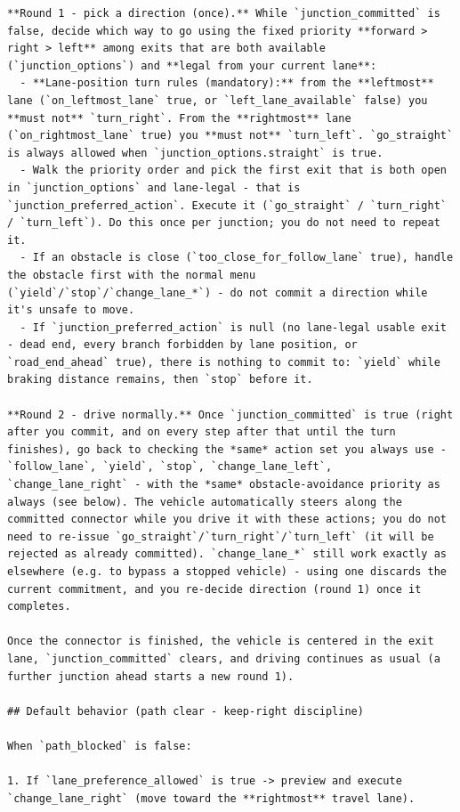 \begin{Verbatim}[breaklines=true,breakanywhere=true,fontsize=\footnotesize]
**Round 1 - pick a direction (once).** While `junction_committed` is false, decide which way to go using the fixed priority **forward > right > left** among exits that are both available (`junction_options`) and **legal from your current lane**:
  - **Lane-position turn rules (mandatory):** from the **leftmost** lane (`on_leftmost_lane` true, or `left_lane_available` false) you **must not** `turn_right`. From the **rightmost** lane (`on_rightmost_lane` true) you **must not** `turn_left`. `go_straight` is always allowed when `junction_options.straight` is true.
  - Walk the priority order and pick the first exit that is both open in `junction_options` and lane-legal - that is `junction_preferred_action`. Execute it (`go_straight` / `turn_right` / `turn_left`). Do this once per junction; you do not need to repeat it.
  - If an obstacle is close (`too_close_for_follow_lane` true), handle the obstacle first with the normal menu (`yield`/`stop`/`change_lane_*`) - do not commit a direction while it's unsafe to move.
  - If `junction_preferred_action` is null (no lane-legal usable exit - dead end, every branch forbidden by lane position, or `road_end_ahead` true), there is nothing to commit to: `yield` while braking distance remains, then `stop` before it.

**Round 2 - drive normally.** Once `junction_committed` is true (right after you commit, and on every step after that until the turn finishes), go back to checking the *same* action set you always use - `follow_lane`, `yield`, `stop`, `change_lane_left`, `change_lane_right` - with the *same* obstacle-avoidance priority as always (see below). The vehicle automatically steers along the committed connector while you drive it with these actions; you do not need to re-issue `go_straight`/`turn_right`/`turn_left` (it will be rejected as already committed). `change_lane_*` still work exactly as elsewhere (e.g. to bypass a stopped vehicle) - using one discards the current commitment, and you re-decide direction (round 1) once it completes.

Once the connector is finished, the vehicle is centered in the exit lane, `junction_committed` clears, and driving continues as usual (a further junction ahead starts a new round 1).

## Default behavior (path clear - keep-right discipline)

When `path_blocked` is false:

1. If `lane_preference_allowed` is true -> preview and execute `change_lane_right` (move toward the **rightmost** travel lane).


\end{Verbatim}
